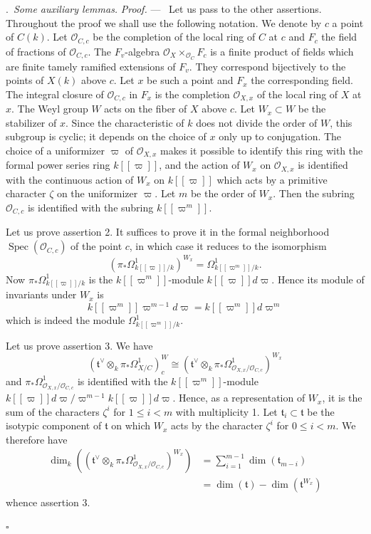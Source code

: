 \documentclass[12pt,a4paper,oneside,english,leqno]{smfart}
\makeatletter
\numberwithin{equation}{subsection}
\numberwithin{theo}{subsection}
\newenvironment{paragr}[1][]{\medskip\refstepcounter{subsection}%
  \par\noindent\hspace*{\parindent}\thesubsection.\ \emph{#1}%
  \@ifundefined{@empty}{}{}\ignorespaces}{\medskip}
\theoremstyle{plain}
\theoremstyle{definition}
\theoremstyle{remark}
\newenvironment{preuve}[1][]{\medskip\noindent\textit{Proof.} #1 ---\ }%
  {\hfill\ensuremath{\square}\medskip}
\DeclareMathOperator{\Spec}{Spec}
\newcommand{\oc}{\mathcal{O}}
\newcommand{\tgo}{\mathfrak{t}}
\renewcommand{\leq}{\leqslant}
\makeatother
\begin{document}
\begin{paragr}[Some auxiliary lemmas.]
\begin{preuve}
Let us pass to the other assertions. Throughout the proof we shall use the following notation. We denote by $c$ a point of $C(k)$. Let $\oc_{C,c}$ be the completion of the local ring of $C$ at $c$ and $F_c$ the field of fractions of $\oc_{C,c}$. The $F_v$-algebra $\oc_X\times_{\oc_C}F_c$ is a finite product of fields which are finite tamely ramified extensions of $F_v$. They correspond bijectively to the points of $X(k)$ above $c$. Let $x$ be such a point and $F_x$ the corresponding field. The integral closure of $\oc_{C,c}$ in $F_x$ is the completion $\oc_{X,x}$ of the local ring of $X$ at $x$. The Weyl group $W$ acts on the fiber of $X$ above $c$. Let $W_x\subset W$ be the stabilizer of $x$. Since the characteristic of $k$ does not divide the order of $W$, this subgroup is cyclic; it depends on the choice of $x$ only up to conjugation. The choice of a uniformizer $\varpi$ of $\oc_{X,x}$ makes it possible to identify this ring with the formal power series ring $k[[\varpi]]$, and the action of $W_x$ on $\oc_{X,x}$ is identified with the continuous action of $W_x$ on $k[[\varpi]]$ which acts by a primitive character $\zeta$ on the uniformizer $\varpi$. Let $m$ be the order of $W_x$. Then the subring $\oc_{C,c}$ is identified with the subring $k[[\varpi^m]]$.

Let us prove assertion 2. It suffices to prove it in the formal neighborhood $\Spec(\oc_{C,c})$ of the point $c$, in which case it reduces to the isomorphism
$$(\pi_*\Omega^1_{k[[\varpi]]/k})^{W_x}=\Omega^1_{k[[\varpi^m]]/k}.$$
Now $\pi_*\Omega^1_{k[[\varpi]]/k}$ is the $k[[\varpi^m]]$-module $k[[\varpi]]d\varpi$. Hence its module of invariants under $W_x$ is
$$k[[\varpi^m]]\varpi^{m-1}d\varpi=k[[\varpi^m]]d\varpi^m$$
which is indeed the module $\Omega^1_{k[[\varpi^m]]/k}$.

Let us prove assertion 3. We have
$$(\tgo^\vee\otimes_k\pi_*\Omega^1_{X/C})^W_c\cong(\tgo^\vee\otimes_k\pi_*\Omega^1_{\oc_{X,x}/\oc_{C,c}})^{W_x}$$
and $\pi_*\Omega^1_{\oc_{X,x}/\oc_{C,c}}$ is identified with the $k[[\varpi^m]]$-module $k[[\varpi]]d\varpi/\varpi^{m-1}k[[\varpi]]d\varpi$. Hence, as a representation of $W_x$, it is the sum of the characters $\zeta^i$ for $1\leq i<m$ with multiplicity 1. Let $\tgo_i\subset\tgo$ be the isotypic component of $\tgo$ on which $W_x$ acts by the character $\zeta^i$ for $0\leq i<m$. We therefore have
\begin{align*}
\dim_k((\tgo^\vee\otimes_k\pi_*\Omega^1_{\oc_{X,x}/\oc_{C,c}})^{W_x})&=\sum_{i=1}^{m-1}\dim(\tgo_{m-i})\\
&=\dim(\tgo)-\dim(\tgo^{W_x})
\end{align*}
whence assertion 3.


\end{preuve}
\end{paragr}
\end{document}
